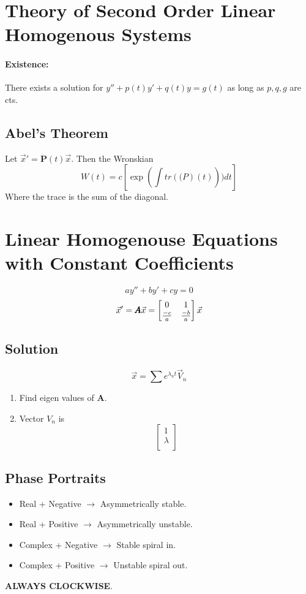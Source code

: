 \documentclass[a4paper,12pt]{report}
\begin{document}
\section{Theory of Second Order Linear Homogenous Systems}
\paragraph{Existence: } There exists a solution for $y'' + p(t)y' + q(t)y = g(t)$ as long as $p, q, g$ are cts. 

\subsection{Abel's Theorem}
Let $\vec{x}' = \pmb{P}(t)\vec{x}$. Then the Wronskian $$W(t) = c[\exp(\int tr(\pmb(P)(t)))dt]$$
Where the trace is the sum of the diagonal. 

\section{Linear Homogenouse Equations with Constant Coefficients}
$$ay'' + by' + cy = 0$$
$$\vec{x}' = \pmb{A}\vec{x} = \begin{bmatrix}
0 & 1 \\
\frac{-c}{a} & \frac{-b}{a} \notag
\end{bmatrix}
\vec{x}
$$

\subsection{Solution}
$$\vec{x} = \sum e^{\lambda_n t}\vec{V}_n$$
\begin{enumerate}
\item Find eigen values of $\pmb{A}$. 
\item Vector $V_n$ is $$\begin{bmatrix}
1 \\
\lambda \\
\end{bmatrix}$$
\end{enumerate}

\subsection{Phase Portraits}
\begin{itemize}
\item Real + Negative $\to $ Asymmetrically stable.
\item Real + Positive $\to $ Asymmetrically unstable.
\item Complex + Negative $\to $ Stable spiral in.
\item Complex + Positive $\to $ Unstable spiral out.
\end{itemize}
\textbf{ALWAYS CLOCKWISE}. 
\end{document}
